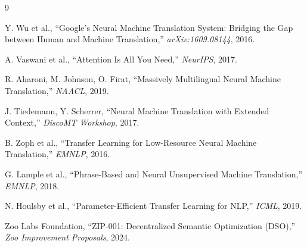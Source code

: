 \documentclass[11pt,a4paper]{article}
\begin{document}

\begin{thebibliography}{9}

Y. Wu et al.,
``Google's Neural Machine Translation System: Bridging the Gap between Human and Machine Translation,''
\textit{arXiv:1609.08144}, 2016.

A. Vaswani et al.,
``Attention Is All You Need,''
\textit{NeurIPS}, 2017.

R. Aharoni, M. Johnson, O. Firat,
``Massively Multilingual Neural Machine Translation,''
\textit{NAACL}, 2019.

J. Tiedemann, Y. Scherrer,
``Neural Machine Translation with Extended Context,''
\textit{DiscoMT Workshop}, 2017.

B. Zoph et al.,
``Transfer Learning for Low-Resource Neural Machine Translation,''
\textit{EMNLP}, 2016.

G. Lample et al.,
``Phrase-Based and Neural Unsupervised Machine Translation,''
\textit{EMNLP}, 2018.

N. Houlsby et al.,
``Parameter-Efficient Transfer Learning for NLP,''
\textit{ICML}, 2019.

Zoo Labs Foundation,
``ZIP-001: Decentralized Semantic Optimization (DSO),''
\textit{Zoo Improvement Proposals}, 2024.

\end{thebibliography}
\end{document}
